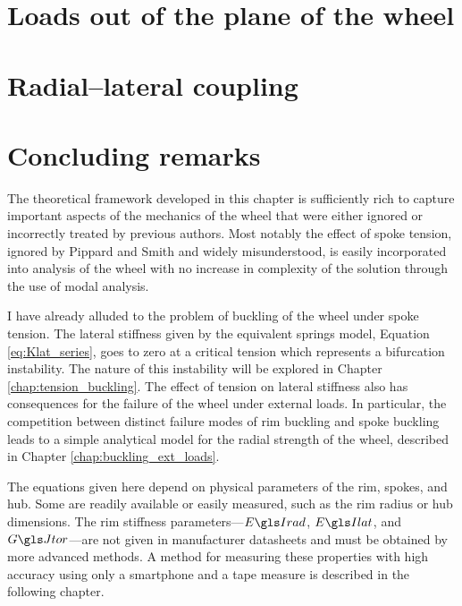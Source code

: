 \documentclass[\rootdir/thesis.tex]{subfiles}
\begin{document}
\section{Loads out of the plane of the wheel}
\label{sec:Lateral}


\section{Radial--lateral coupling}
\label{sec:coupling}



\section{Concluding remarks}

The theoretical framework developed in this chapter is sufficiently rich to capture important aspects of the mechanics of the wheel that were either ignored or incorrectly treated by previous authors. Most notably the effect of spoke tension, ignored by Pippard and Smith and widely misunderstood, is easily incorporated into analysis of the wheel with no increase in complexity of the solution through the use of modal analysis.

I have already alluded to the problem of buckling of the wheel under spoke tension. The lateral stiffness given by the equivalent springs model, Equation \ref{eq:Klat_series}, goes to zero at a critical tension which represents a bifurcation instability. The nature of this instability will be explored in Chapter \ref{chap:tension_buckling}. The effect of tension on lateral stiffness also has consequences for the failure of the wheel under external loads. In particular, the competition between distinct failure modes of rim buckling and spoke buckling leads to a simple analytical model for the radial strength of the wheel, described in Chapter \ref{chap:buckling_ext_loads}.

The equations given here depend on physical parameters of the rim, spokes, and hub. Some are readily available or easily measured, such as the rim radius or hub dimensions. The rim stiffness parameters---$\EIr$, $\EIl$, and $\GJ$---are not given in manufacturer datasheets and must be obtained by more advanced methods. A method for measuring these properties with high accuracy using only a smartphone and a tape measure is described in the following chapter.
\end{document}
